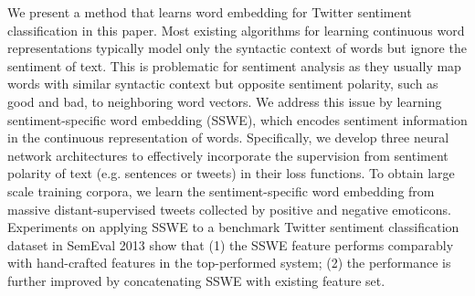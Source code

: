 We present a method that learns word embedding for Twitter sentiment classification in this paper. Most existing algorithms for learning continuous word representations typically model only the syntactic context of words but ignore the sentiment of text. This is problematic for sentiment analysis as they usually map words with similar syntactic context but opposite sentiment polarity, such as good and bad, to neighboring word vectors. We address this issue by learning sentiment-specific word embedding (SSWE), which encodes sentiment information in the continuous representation of words. Specifically, we develop three neural network architectures to effectively incorporate the supervision from sentiment polarity of text (e.g. sentences or tweets) in their loss functions. To obtain large scale training corpora, we learn the sentiment-specific word embedding from massive distant-supervised tweets collected by positive and negative emoticons. Experiments on applying SSWE to a benchmark Twitter sentiment classification dataset in SemEval 2013 show that (1) the SSWE feature performs comparably with hand-crafted features in the top-performed system; (2) the performance is further improved by concatenating SSWE with existing feature set.

